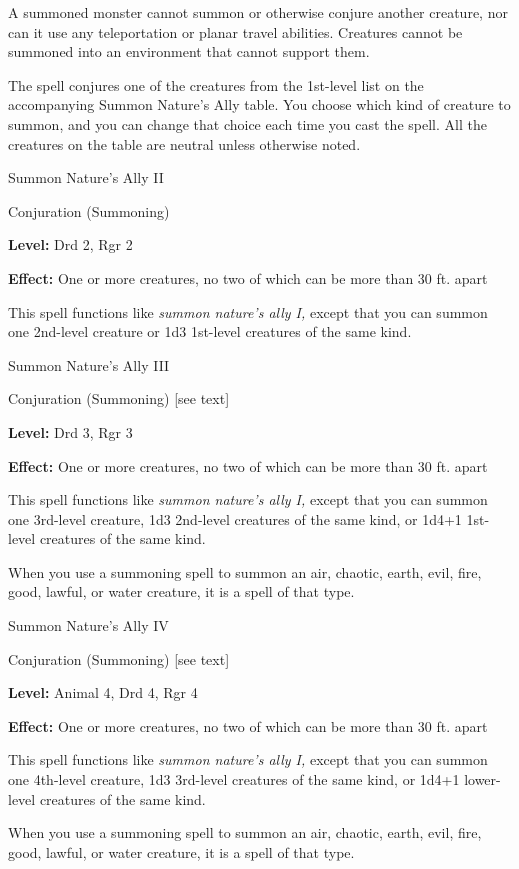 \documentclass{article}
\begin{document}
A summoned monster cannot summon or otherwise conjure another creature, nor can 
it use any teleportation or planar travel abilities. Creatures cannot be summoned 
into an environment that cannot support them.

The spell conjures one of the creatures from the 1st-level list on the accompanying 
Summon Nature's Ally table. You choose which kind of creature to summon, and you 
can change that choice each time you cast the spell. All the creatures on the table 
are neutral unless otherwise noted.

\vspace{12pt}
Summon Nature's Ally II

Conjuration (Summoning)

\textbf{Level:} Drd 2, Rgr 2

\textbf{Effect:} One or more creatures, no two of which can be more than 30 ft. 
apart

This spell functions like \textit{summon nature's ally I, }except that you can 
summon one 2nd-level creature or 1d3 1st-level creatures of the same kind.

\vspace{12pt}
Summon Nature's Ally III

Conjuration (Summoning) [see text]

\textbf{Level:} Drd 3, Rgr 3

\textbf{Effect:} One or more creatures, no two of which can be more than 30 ft. 
apart

This spell functions like \textit{summon nature's ally I, }except that you can 
summon one 3rd-level creature, 1d3 2nd-level creatures of the same kind, or 1d4+1 
1st-level creatures of the same kind.

When you use a summoning spell to summon an air, chaotic, earth, evil, fire, good, 
lawful, or water creature, it is a spell of that type. 

Summon Nature's Ally IV

Conjuration (Summoning) [see text]

\textbf{Level:} Animal 4, Drd 4, Rgr 4

\textbf{Effect:} One or more creatures, no two of which can be more than 30 ft. 
apart

This spell functions like \textit{summon nature's ally I, }except that you can 
summon one 4th-level creature, 1d3 3rd-level creatures of the same kind, or 1d4+1 
lower-level creatures of the same kind.

When you use a summoning spell to summon an air, chaotic, earth, evil, fire, good, 
lawful, or water creature, it is a spell of that type.
\end{document}
